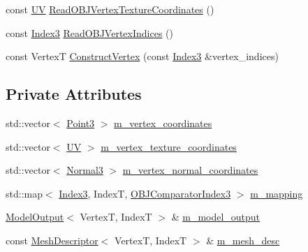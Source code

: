 \begin{DoxyCompactItemize}
\item 
const \hyperlink{structmage_1_1_u_v}{UV} \hyperlink{classmage_1_1loader_1_1_o_b_j_reader_acb7b69622e6dbd85149377819ae8b997}{Read\+O\+B\+J\+Vertex\+Texture\+Coordinates} ()
\item 
const \hyperlink{classmage_1_1loader_1_1_o_b_j_reader_af9aab131e88c5a3a0f29b156c4c97096}{Index3} \hyperlink{classmage_1_1loader_1_1_o_b_j_reader_a0647bb9573512a480125744c0f100618}{Read\+O\+B\+J\+Vertex\+Indices} ()
\item 
const VertexT \hyperlink{classmage_1_1loader_1_1_o_b_j_reader_ac78fe5537ba2d3098a9f0a8858893dd3}{Construct\+Vertex} (const \hyperlink{classmage_1_1loader_1_1_o_b_j_reader_af9aab131e88c5a3a0f29b156c4c97096}{Index3} \&vertex\+\_\+indices)
\end{DoxyCompactItemize}
\subsection*{Private Attributes}
\begin{DoxyCompactItemize}
\item 
std\+::vector$<$ \hyperlink{structmage_1_1_point3}{Point3} $>$ \hyperlink{classmage_1_1loader_1_1_o_b_j_reader_adf05a751f03eeaccccf496710be4cae9}{m\+\_\+vertex\+\_\+coordinates}
\item 
std\+::vector$<$ \hyperlink{structmage_1_1_u_v}{UV} $>$ \hyperlink{classmage_1_1loader_1_1_o_b_j_reader_a9025e0039c3c4d7e25bf40dc0f4431c0}{m\+\_\+vertex\+\_\+texture\+\_\+coordinates}
\item 
std\+::vector$<$ \hyperlink{structmage_1_1_normal3}{Normal3} $>$ \hyperlink{classmage_1_1loader_1_1_o_b_j_reader_a344094087b3f0978c599970e35f77aac}{m\+\_\+vertex\+\_\+normal\+\_\+coordinates}
\item 
std\+::map$<$ \hyperlink{classmage_1_1loader_1_1_o_b_j_reader_af9aab131e88c5a3a0f29b156c4c97096}{Index3}, IndexT, \hyperlink{structmage_1_1loader_1_1_o_b_j_reader_1_1_o_b_j_comparator_index3}{O\+B\+J\+Comparator\+Index3} $>$ \hyperlink{classmage_1_1loader_1_1_o_b_j_reader_a4538c827571318be8563ba44974791ee}{m\+\_\+mapping}
\item 
\hyperlink{structmage_1_1_model_output}{Model\+Output}$<$ VertexT, IndexT $>$ \& \hyperlink{classmage_1_1loader_1_1_o_b_j_reader_a19ba3dbb5f6d5a7090d6b2cf12a4979a}{m\+\_\+model\+\_\+output}
\item 
const \hyperlink{structmage_1_1_mesh_descriptor}{Mesh\+Descriptor}$<$ VertexT, IndexT $>$ \& \hyperlink{classmage_1_1loader_1_1_o_b_j_reader_ab0da26407762a9322c0d65b8960cb0f9}{m\+\_\+mesh\+\_\+desc}
\end{DoxyCompactItemize}


